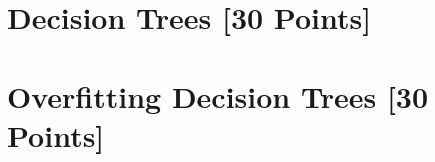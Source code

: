 \newif\ifshowsolutions
\showsolutionstrue







\pagestyle{fancy}



\newpage
\section{Decision Trees [30 Points]}

\problem[7]
\begin{solution}
\end{solution}


\newpage
\problem[4]
\begin{solution}
\end{solution}
\newpage


\problem[15]
\subproblem[5] 
\begin{subsolution}
\end{subsolution}
\newpage


\subproblem[5] 
\begin{subsolution}
\end{subsolution}
\newpage


\subproblem[5] 
\begin{subsolution}
\end{subsolution}
\newpage



\problem[4] 
\begin{solution}
\end{solution}
\newpage


\section{Overfitting Decision Trees [30 Points]}


\indent\problem[7] %
\begin{solution}
\end{solution}
\newpage


